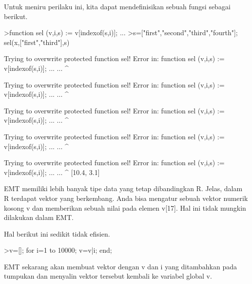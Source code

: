 \documentclass[a4paper,10pt]{article}
\begin{document}
\begin{eulernotebook}
\begin{eulercomment}
\begin{eulercomment}
\begin{eulercomment}
\begin{eulercomment}
\begin{eulercomment}
\begin{eulercomment}
\begin{eulercomment}
\begin{eulercomment}
\begin{eulercomment}
\begin{eulercomment}
\begin{eulercomment}
\begin{eulercomment}
\begin{eulercomment}
\begin{eulercomment}
\begin{eulercomment}
\begin{eulercomment}
\begin{eulercomment}
\begin{eulercomment}
\begin{eulercomment}
\begin{eulercomment}
\begin{eulercomment}
\begin{eulercomment}
\begin{eulercomment}
Untuk meniru perilaku ini, kita dapat mendefinisikan sebuah fungsi
sebagai berikut.
\end{eulercomment}
\begin{eulerprompt}
>function sel (v,i,s) := v[indexof(s,i)]; ...
>s=["first","second","third","fourth"]; sel(x,["first","third"],s)
\end{eulerprompt}
\begin{euleroutput}
  
  Trying to overwrite protected function sel!
  Error in:
  function sel (v,i,s) := v[indexof(s,i)]; ... ...
               ^
  
  Trying to overwrite protected function sel!
  Error in:
  function sel (v,i,s) := v[indexof(s,i)]; ... ...
               ^
  
  Trying to overwrite protected function sel!
  Error in:
  function sel (v,i,s) := v[indexof(s,i)]; ... ...
               ^
  
  Trying to overwrite protected function sel!
  Error in:
  function sel (v,i,s) := v[indexof(s,i)]; ... ...
               ^
  
  Trying to overwrite protected function sel!
  Error in:
  function sel (v,i,s) := v[indexof(s,i)]; ... ...
               ^
  [10.4,  3.1]
\end{euleroutput}
\begin{eulercomment}
EMT memiliki lebih banyak tipe data yang tetap dibandingkan R. Jelas,
dalam R terdapat vektor yang berkembang. Anda bisa mengatur sebuah
vektor numerik kosong v dan memberikan sebuah nilai pada elemen v[17].
Hal ini tidak mungkin dilakukan dalam EMT.

Hal berikut ini sedikit tidak efisien.
\end{eulercomment}
\begin{eulerprompt}
>v=[]; for i=1 to 10000; v=v|i; end;
\end{eulerprompt}
\begin{eulercomment}
EMT sekarang akan membuat vektor dengan v dan i yang ditambahkan pada
tumpukan dan menyalin vektor tersebut kembali ke variabel global v.


\end{eulercomment}
\end{eulercomment}
\end{eulercomment}
\end{eulercomment}
\end{eulercomment}
\end{eulercomment}
\end{eulercomment}
\end{eulercomment}
\end{eulercomment}
\end{eulercomment}
\end{eulercomment}
\end{eulercomment}
\end{eulercomment}
\end{eulercomment}
\end{eulercomment}
\end{eulercomment}
\end{eulercomment}
\end{eulercomment}
\end{eulercomment}
\end{eulercomment}
\end{eulercomment}
\end{eulercomment}
\end{eulercomment}
\end{eulernotebook}
\end{document}

